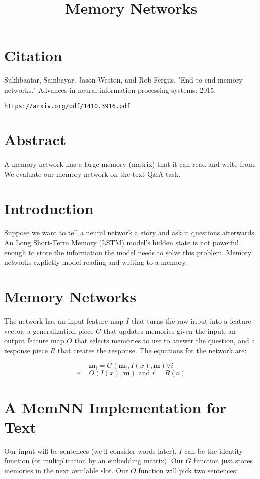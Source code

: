 \documentclass[a4paper]{article}
\title{Memory Networks}
\date{}
\begin{document}
\maketitle

\section{Citation}
Sukhbaatar, Sainbayar, Jason Weston, and Rob Fergus. "End-to-end memory networks." Advances in neural information processing systems. 2015.

\begin{verbatim}
https://arxiv.org/pdf/1410.3916.pdf
\end{verbatim}

\section{Abstract}
A memory network has a large memory (matrix) that it can read and write from.
We evaluate our memory network on the text Q&A task.

\section{Introduction}
Suppose we want to tell a neural network a story and ask it questions
afterwards. An Long Short-Term Memory (LSTM) model's hidden state is not
powerful enough to store the information the model needs to solve this
problem. Memory networks explictly model reading and writing to a memory.

\section{Memory Networks}
The network has an input feature map $I$ that turns the raw input into a
feature vector, a generalization piece $G$ that updates memories given
the input, an output feature map $O$ that selects memories to use to
answer the question, and a response piece $R$ that creates the response.
The equations for the network are:

$$
\mathbf{m}_i = G(\mathbf{m}_i, I(x), \mathbf{m}) \forall i
$$
$$
o = O(I(x), \mathbf{m}) \text{ and } r = R(o)
$$


\section{A MemNN Implementation for Text}
Our input will be sentences (we'll consider words later). $I$ can be the
identity function (or multiplication by an embedding matrix). Our $G$ function
just stores memories in the next available slot. Our $O$ function will pick
two sentences:
\end{document}
